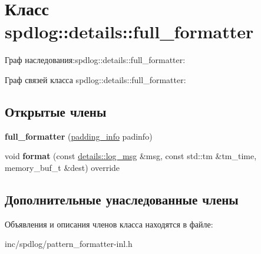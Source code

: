 \hypertarget{classspdlog_1_1details_1_1full__formatter}{}\section{Класс spdlog\+:\+:details\+:\+:full\+\_\+formatter}
\label{classspdlog_1_1details_1_1full__formatter}


Граф наследования\+:spdlog\+:\+:details\+:\+:full\+\_\+formatter\+:


Граф связей класса spdlog\+:\+:details\+:\+:full\+\_\+formatter\+:
\subsection*{Открытые члены}
\begin{DoxyCompactItemize}
\item 
\mbox{\label{classspdlog_1_1details_1_1full__formatter_ac0212ed0f1efbb64726ddd73b62b20a0}} 
{\bfseries full\+\_\+formatter} (\hyperlink{structspdlog_1_1details_1_1padding__info}{padding\+\_\+info} padinfo)
\item 
\mbox{\label{classspdlog_1_1details_1_1full__formatter_a4c2c0e4ae5c39e4b6457196c3ab748ff}} 
void {\bfseries format} (const \hyperlink{structspdlog_1_1details_1_1log__msg}{details\+::log\+\_\+msg} \&msg, const std\+::tm \&tm\+\_\+time, memory\+\_\+buf\+\_\+t \&dest) override
\end{DoxyCompactItemize}
\subsection*{Дополнительные унаследованные члены}


Объявления и описания членов класса находятся в файле\+:\begin{DoxyCompactItemize}
\item 
inc/spdlog/pattern\+\_\+formatter-\/inl.\+h\end{DoxyCompactItemize}

